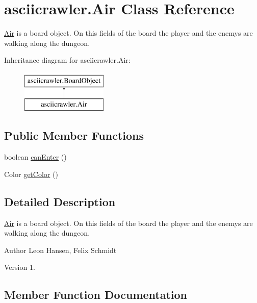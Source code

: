 \hypertarget{classasciicrawler_1_1Air}{}\section{asciicrawler.\+Air Class Reference}
\label{classasciicrawler_1_1Air}


\hyperlink{classasciicrawler_1_1Air}{Air} is a board object. On this fields of the board the player and the enemys are walking along the dungeon.  


Inheritance diagram for asciicrawler.\+Air\+:\begin{figure}[H]
\begin{center}
\leavevmode
\includegraphics[height=2.000000cm]{classasciicrawler_1_1Air}
\end{center}
\end{figure}
\subsection*{Public Member Functions}
\begin{DoxyCompactItemize}
\item 
boolean \hyperlink{classasciicrawler_1_1Air_ac674c1f8c90cdda29eb7f12ed794eb4c}{can\+Enter} ()
\item 
Color \hyperlink{classasciicrawler_1_1Air_a4f2f155658f758d97a85944b117a87f3}{get\+Color} ()
\end{DoxyCompactItemize}


\subsection{Detailed Description}
\hyperlink{classasciicrawler_1_1Air}{Air} is a board object. On this fields of the board the player and the enemys are walking along the dungeon. 

\begin{DoxyAuthor}{Author}
Leon Hansen, Felix Schmidt 
\end{DoxyAuthor}
\begin{DoxyVersion}{Version}
1. 
\end{DoxyVersion}


\subsection{Member Function Documentation}
\mbox{\label{classasciicrawler_1_1Air_ac674c1f8c90cdda29eb7f12ed794eb4c}} 
